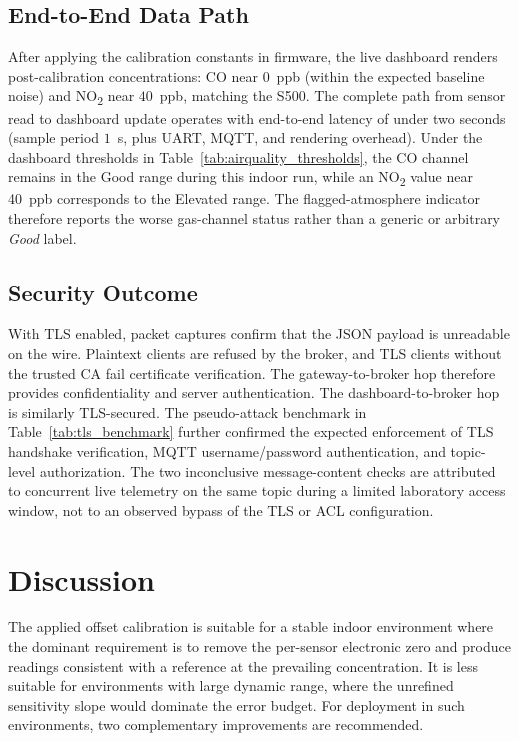 \documentclass[conference]{IEEEtran}
\begin{document}
\subsection{End-to-End Data Path}
After applying the calibration constants in firmware, the live dashboard renders post-calibration concentrations: CO near $0$~ppb (within the expected baseline noise) and NO\textsubscript{2} near $40$~ppb, matching the S500. The complete path from sensor read to dashboard update operates with end-to-end latency of under two seconds (sample period $1$~s, plus UART, MQTT, and rendering overhead). Under the dashboard thresholds in Table~\ref{tab:airquality_thresholds}, the CO channel remains in the Good range during this indoor run, while an NO\textsubscript{2} value near 40~ppb corresponds to the Elevated range. The flagged-atmosphere indicator therefore reports the worse gas-channel status rather than a generic or arbitrary \textit{Good} label.

\subsection{Security Outcome}
With TLS enabled, packet captures confirm that the JSON payload is unreadable on the wire. Plaintext clients are refused by the broker, and TLS clients without the trusted CA fail certificate verification. The gateway-to-broker hop therefore provides confidentiality and server authentication. The dashboard-to-broker hop is similarly TLS-secured. The pseudo-attack benchmark in Table~\ref{tab:tls_benchmark} further confirmed the expected enforcement of TLS handshake verification, MQTT username/password authentication, and topic-level authorization. The two inconclusive message-content checks are attributed to concurrent live telemetry on the same topic during a limited laboratory access window, not to an observed bypass of the TLS or ACL configuration.

\section{Discussion}

The applied offset calibration is suitable for a stable indoor environment where the dominant requirement is to remove the per-sensor electronic zero and produce readings consistent with a reference at the prevailing concentration. It is less suitable for environments with large dynamic range, where the unrefined sensitivity slope would dominate the error budget. For deployment in such environments, two complementary improvements are recommended.
\end{document}
